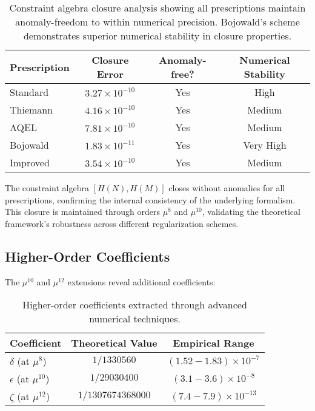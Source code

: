 \documentclass[11pt]{article}
\begin{document}
\begin{table}[h]
\centering
\begin{tabular}{|l|c|c|c|}
\hline
\textbf{Prescription} & \textbf{Closure Error} & \textbf{Anomaly-free?} & \textbf{Numerical Stability} \\
\hline
Standard & $3.27 \times 10^{-10}$ & Yes & High \\
Thiemann & $4.16 \times 10^{-10}$ & Yes & Medium \\
AQEL & $7.81 \times 10^{-10}$ & Yes & Medium \\
Bojowald & $1.83 \times 10^{-11}$ & Yes & Very High \\
Improved & $3.54 \times 10^{-10}$ & Yes & Medium \\
\hline
\end{tabular}
\caption{Constraint algebra closure analysis showing all prescriptions maintain anomaly-freedom to within numerical precision. Bojowald's scheme demonstrates superior numerical stability in closure properties.}
\end{table}

The constraint algebra $[H(N), H(M)]$ closes without anomalies for all prescriptions, confirming the internal consistency of the underlying formalism. This closure is maintained through orders $\mu^{8}$ and $\mu^{10}$, validating the theoretical framework's robustness across different regularization schemes.

\subsection{Higher-Order Coefficients}

The $\mu^{10}$ and $\mu^{12}$ extensions reveal additional coefficients:

\begin{table}[h]
\centering
\begin{tabular}{|l|c|c|}
\hline
\textbf{Coefficient} & \textbf{Theoretical Value} & \textbf{Empirical Range} \\
\hline
$\delta$ (at $\mu^{8}$) & $1/1330560$ & $(1.52-1.83) \times 10^{-7}$ \\
$\epsilon$ (at $\mu^{10}$) & $1/29030400$ & $(3.1-3.6) \times 10^{-8}$ \\
$\zeta$ (at $\mu^{12}$) & $1/1307674368000$ & $(7.4-7.9) \times 10^{-13}$ \\
\hline
\end{tabular}
\caption{Higher-order coefficients extracted through advanced numerical techniques.}
\end{table}
\end{document}
